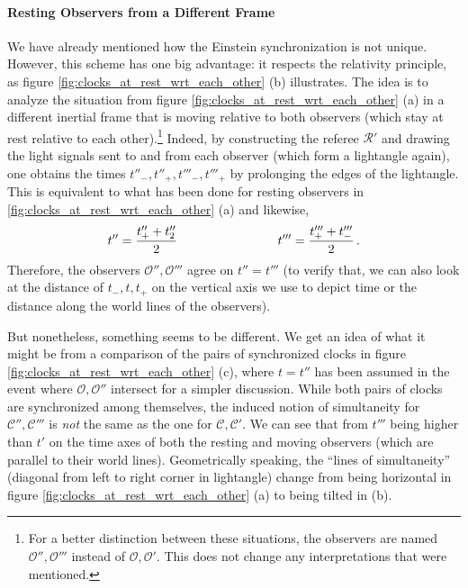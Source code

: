 			\paragraph{Resting Observers from a Different Frame}
We have already mentioned how the Einstein synchronization is not unique. However, this scheme has one big advantage: it respects the relativity principle, as figure \ref{fig:clocks_at_rest_wrt_each_other} (b) illustrates. The idea is to analyze the situation from figure \ref{fig:clocks_at_rest_wrt_each_other} (a) in a different inertial frame that is moving relative to both observers (which stay at rest relative to each other).\footnote{For a better distinction between these situations, the observers are named $\mathcal{O}'', \mathcal{O}'''$ instead of $\mathcal{O}, \mathcal{O}'$. This does not change any interpretations that were mentioned.} Indeed, by constructing the referee $\mathcal{R}'$ and drawing the light signals sent to and from each observer (which form a lightangle again), one obtains the times $t''_-, t''_+, t'''_-, t'''_+$ by prolonging the edges of the lightangle. This is equivalent to what has been done for resting observers in \ref{fig:clocks_at_rest_wrt_each_other} (a) and likewise,
\begin{equation}
	t'' = \frac{t''_+ + t''_2}{2}
	\qquad \qquad \qquad \qquad
	t''' = \frac{t'''_+ + t'''_-}{2}
	\, .
\end{equation}
Therefore, the observers $\mathcal{O}'', \mathcal{O}'''$ agree on $t'' = t'''$ (to verify that, we can also look at the distance of $t_-, t, t_+$ on the vertical axis we use to depict time or the distance along the world lines of the observers).

But nonetheless, something seems to be different. We get an idea of what it might be from a comparison of the pairs of synchronized clocks in figure \ref{fig:clocks_at_rest_wrt_each_other} (c), where  $t = t''$ has been assumed in the event where $\mathcal{O}, \mathcal{O}''$ intersect for a simpler discussion. While both pairs of clocks are synchronized among themselves, the induced notion of simultaneity for $\mathcal{C}'', \mathcal{C}'''$ is \emph{not} the same as the one for $\mathcal{C}, \mathcal{C}'$. We can see that from $t'''$ being higher than $t'$ on the time axes of both the resting and moving observers (which are parallel to their world lines). Geometrically speaking, the \enquote{lines of simultaneity} (diagonal from left to right corner in lightangle) change from being horizontal in figure \ref{fig:clocks_at_rest_wrt_each_other} (a) to being tilted in (b).\\


